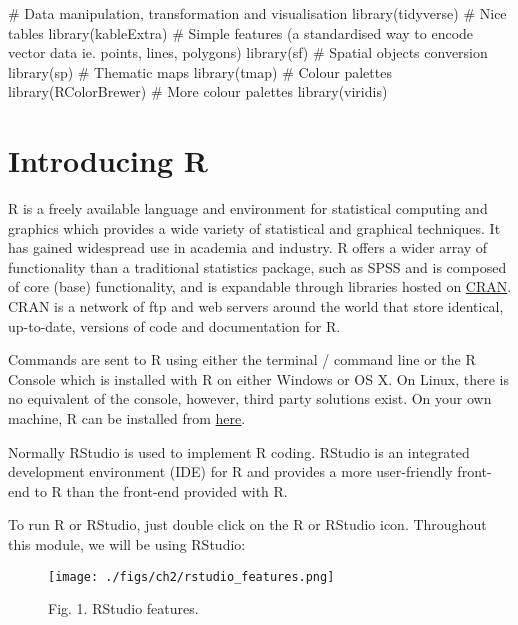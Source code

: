 \documentclass[
  letterpaper,
  krantz2]{style/krantz}
\newenvironment{Shaded}{\begin{snugshade}}{\end{snugshade}}
\newcommand{\CommentTok}[1]{\textcolor[rgb]{0.37,0.37,0.37}{#1}}
\newcommand{\FunctionTok}[1]{\textcolor[rgb]{0.28,0.35,0.67}{#1}}
\newcommand{\NormalTok}[1]{\textcolor[rgb]{0.00,0.23,0.31}{#1}}
\begin{document}
\begin{Shaded}
\begin{Highlighting}[]
\CommentTok{\# Data manipulation, transformation and visualisation}
\FunctionTok{library}\NormalTok{(tidyverse)}
\CommentTok{\# Nice tables}
\FunctionTok{library}\NormalTok{(kableExtra)}
\CommentTok{\# Simple features (a standardised way to encode vector data ie. points, lines, polygons)}
\FunctionTok{library}\NormalTok{(sf) }
\CommentTok{\# Spatial objects conversion}
\FunctionTok{library}\NormalTok{(sp) }
\CommentTok{\# Thematic maps}
\FunctionTok{library}\NormalTok{(tmap) }
\CommentTok{\# Colour palettes}
\FunctionTok{library}\NormalTok{(RColorBrewer) }
\CommentTok{\# More colour palettes}
\FunctionTok{library}\NormalTok{(viridis)}
\end{Highlighting}
\end{Shaded}

\hypertarget{introducing-r}{%
\section{Introducing R}\label{introducing-r}}

R is a freely available language and environment for statistical
computing and graphics which provides a wide variety of statistical and
graphical techniques. It has gained widespread use in academia and
industry. R offers a wider array of functionality than a traditional
statistics package, such as SPSS and is composed of core (base)
functionality, and is expandable through libraries hosted on
\href{https://cran.r-project.org}{CRAN}. CRAN is a network of ftp and
web servers around the world that store identical, up-to-date, versions
of code and documentation for R.

Commands are sent to R using either the terminal / command line or the R
Console which is installed with R on either Windows or OS X. On Linux,
there is no equivalent of the console, however, third party solutions
exist. On your own machine, R can be installed from
\href{https://www.r-project.org/}{here}.

Normally RStudio is used to implement R coding. RStudio is an integrated
development environment (IDE) for R and provides a more user-friendly
front-end to R than the front-end provided with R.

To run R or RStudio, just double click on the R or RStudio icon.
Throughout this module, we will be using RStudio:

\begin{figure}

{\centering \texttt{[image: ./figs/ch2/rstudio\_features.png]}

}

\caption{Fig. 1. RStudio features.}

\end{figure}
\end{document}
